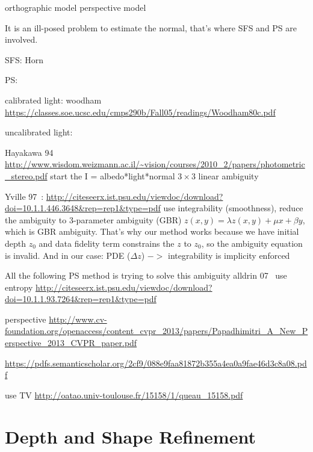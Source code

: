 orthographic model
perspective model

It is an ill-posed problem to estimate the normal, that's where SFS and PS are involved. 

SFS:
Horn

PS:

calibrated light: woodham~\cite{woodham1980photometric} \url{https://classes.soe.ucsc.edu/cmps290b/Fall05/readings/Woodham80c.pdf}

uncalibrated light:

Hayakawa 94~\cite{hayakawa1994photometric} \url{http://www.wisdom.weizmann.ac.il/~vision/courses/2010_2/papers/photometric_stereo.pdf}
start the I = albedo*light*normal $3\times3$ linear ambiguity

Yville 97~\cite{yuille1997shape}: \url{http://citeseerx.ist.psu.edu/viewdoc/download?doi=10.1.1.446.3648&rep=rep1&type=pdf}
use integrability (smoothness), reduce the ambiguity to 3-parameter ambiguity (GBR)
$z(x,y) = \lambda z(x,y) + \mu x + \beta y$, which is GBR ambiguity. That's why our method works because we have initial depth $z_0$ and data fidelity term constrains the $z$ to $z_0$, so the ambiguity equation is invalid. 
And in our case: PDE ($\Delta z$) $->$ integrability is implicity enforced

All the following PS method is trying to solve this ambiguity
alldrin 07~\cite{alldrin2007resolving} use entropy \url{http://citeseerx.ist.psu.edu/viewdoc/download?doi=10.1.1.93.7264&rep=rep1&type=pdf}

\cite{papadhimitri2013new} perspective \url{http://www.cv-foundation.org/openaccess/content_cvpr_2013/papers/Papadhimitri_A_New_Perspective_2013_CVPR_paper.pdf}

\cite{papadhimitri2014closed}\url{https://pdfs.semanticscholar.org/2cf9/088e9faa81872b355a4ea0a9fae46d3c8a08.pdf}

\cite{queau2015solving} use TV \url{http://oatao.univ-toulouse.fr/15158/1/queau_15158.pdf}



\section{Depth and Shape Refinement}

